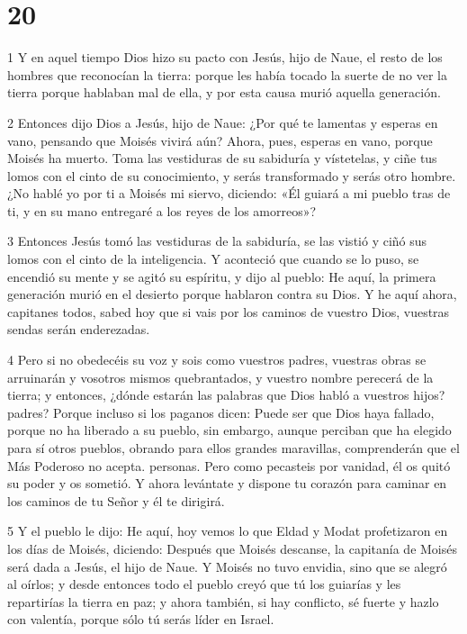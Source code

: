\chapter{20}

\par 1 Y en aquel tiempo Dios hizo su pacto con Jesús, hijo de Naue, el resto de los hombres que reconocían la tierra: porque les había tocado la suerte de no ver la tierra porque hablaban mal de ella, y por esta causa murió aquella generación.

\par 2 Entonces dijo Dios a Jesús, hijo de Naue: ¿Por qué te lamentas y esperas en vano, pensando que Moisés vivirá aún? Ahora, pues, esperas en vano, porque Moisés ha muerto. Toma las vestiduras de su sabiduría y vístetelas, y ciñe tus lomos con el cinto de su conocimiento, y serás transformado y serás otro hombre. ¿No hablé yo por ti a Moisés mi siervo, diciendo: «Él guiará a mi pueblo tras de ti, y en su mano entregaré a los reyes de los amorreos»?

\par 3 Entonces Jesús tomó las vestiduras de la sabiduría, se las vistió y ciñó sus lomos con el cinto de la inteligencia. Y aconteció que cuando se lo puso, se encendió su mente y se agitó su espíritu, y dijo al pueblo: He aquí, la primera generación murió en el desierto porque hablaron contra su Dios. Y he aquí ahora, capitanes todos, sabed hoy que si vais por los caminos de vuestro Dios, vuestras sendas serán enderezadas.

\par 4 Pero si no obedecéis su voz y sois como vuestros padres, vuestras obras se arruinarán y vosotros mismos quebrantados, y vuestro nombre perecerá de la tierra; y entonces, ¿dónde estarán las palabras que Dios habló a vuestros hijos? padres? Porque incluso si los paganos dicen: Puede ser que Dios haya fallado, porque no ha liberado a su pueblo, sin embargo, aunque perciban que ha elegido para sí otros pueblos, obrando para ellos grandes maravillas, comprenderán que el Más Poderoso no acepta. personas. Pero como pecasteis por vanidad, él os quitó su poder y os sometió. Y ahora levántate y dispone tu corazón para caminar en los caminos de tu Señor y él te dirigirá.

\par 5 Y el pueblo le dijo: He aquí, hoy vemos lo que Eldad y Modat profetizaron en los días de Moisés, diciendo: Después que Moisés descanse, la capitanía de Moisés será dada a Jesús, el hijo de Naue. Y Moisés no tuvo envidia, sino que se alegró al oírlos; y desde entonces todo el pueblo creyó que tú los guiarías y les repartirías la tierra en paz; y ahora también, si hay conflicto, sé fuerte y hazlo con valentía, porque sólo tú serás líder en Israel.

